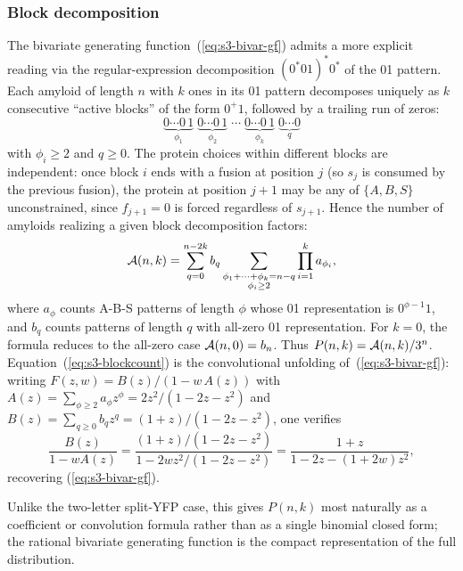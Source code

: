 \documentclass[referee,lineno,pdflatex,sn-mathphys-ay]{sn-jnl}
\newcommand{\cA}{ {\cal A} }
\begin{document}
\subsubsection{Block decomposition} The bivariate generating function~(\ref{eq:s3-bivar-gf}) admits a more explicit reading via the regular-expression decomposition $(0^*01)^*0^*$ of the 01 pattern. Each amyloid of length $n$ with $k$ ones in its 01 pattern decomposes uniquely as $k$ consecutive ``active blocks'' of the form $0^+ 1$, followed by a trailing run of zeros:
\[
\underbrace{0\cdots 0\, 1}_{\phi_1} \; \underbrace{0\cdots 0\, 1}_{\phi_2} \; \cdots \; \underbrace{0\cdots 0\, 1}_{\phi_k} \; \underbrace{0\cdots 0}_{q}
\]
with $\phi_i \ge 2$ and $q \ge 0$. The protein choices within different blocks are independent: once block $i$ ends with a fusion at position $j$ (so $s_j$ is consumed by the previous fusion), the protein at position $j+1$ may be any of $\{A, B, S\}$ unconstrained, since $f_{j+1} = 0$ is forced regardless of $s_{j+1}$. Hence the number of amyloids realizing a given block decomposition factors:
\begin{equation}\label{eq:s3-blockcount}
\cA(n,k) = \sum_{q=0}^{n - 2k} b_q \sum_{\substack{\phi_1 + \cdots + \phi_k = n-q \\ \phi_i \ge 2}} \prod_{i=1}^k a_{\phi_i},
\end{equation}
where $a_\phi$ counts A-B-S patterns of length $\phi$ whose 01 representation is $0^{\phi-1} 1$, and $b_q$ counts patterns of length $q$ with all-zero 01 representation. For $k=0$, the formula reduces to the all-zero case $\cA(n,0)=b_n$. Thus $P(n,k)=\cA(n,k)/3^n$. Equation~(\ref{eq:s3-blockcount}) is the convolutional unfolding of~(\ref{eq:s3-bivar-gf}): writing $F(z, w) = B(z) / (1 - w\, A(z))$ with $A(z) = \sum_{\phi \ge 2} a_\phi z^\phi = 2 z^2 / (1 - 2z - z^2)$ and $B(z) = \sum_{q \ge 0} b_q z^q = (1+z)/(1 - 2z - z^2)$, one verifies
\[
\frac{B(z)}{1 - w A(z)} = \frac{(1+z)/(1 - 2z - z^2)}{1 - 2 w z^2/(1 - 2z - z^2)} = \frac{1 + z}{1 - 2z - (1 + 2w) z^2},
\]
recovering (\ref{eq:s3-bivar-gf}).

Unlike the two-letter split-YFP case, this gives $P(n,k)$ most naturally as a coefficient or convolution formula rather than as a single binomial closed form; the rational bivariate generating function is the compact representation of the full distribution.
\end{document}
